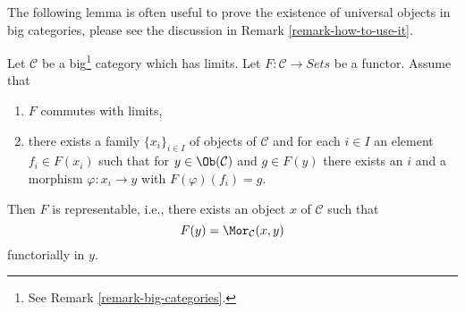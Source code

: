 \noindent
The following lemma is often useful to prove the existence of
universal objects in big categories, please see the discussion
in Remark \ref{remark-how-to-use-it}.

\begin{lemma}
\label{lemma-a-version-of-brown}
Let $\mathcal{C}$ be a big\footnote{See Remark \ref{remark-big-categories}.}
category which has limits. Let $F : \mathcal{C} \to \textit{Sets}$ be a
functor. Assume that
\begin{enumerate}
\item $F$ commutes with limits,
\item there exists a family $\{x_i\}_{i \in I}$ of objects of $\mathcal{C}$
and for each $i \in I$ an element $f_i \in F(x_i)$
such that for $y \in \Ob(\mathcal{C})$ and $g \in F(y)$
there exists an $i$ and a morphism $\varphi : x_i \to y$
with $F(\varphi)(f_i) = g$.
\end{enumerate}
Then $F$ is representable, i.e., there exists an object $x$
of $\mathcal{C}$ such that
$$
F(y) = \Mor_\mathcal{C}(x, y)
$$
functorially in $y$.
\end{lemma}


